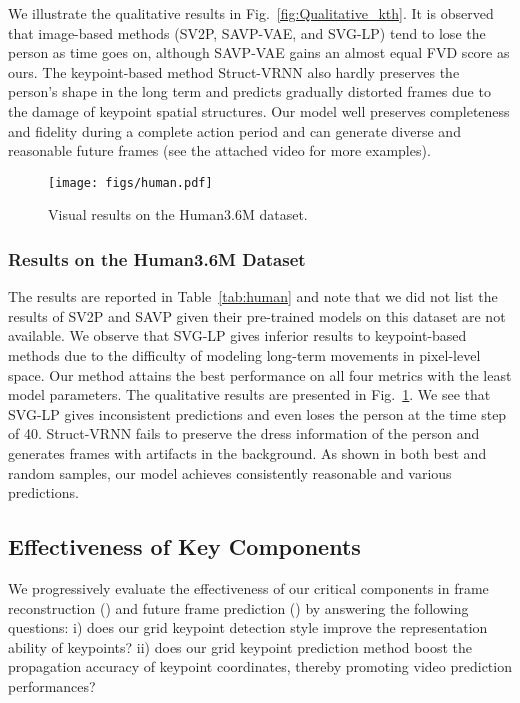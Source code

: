 \documentclass[letterpaper, 10 pt, conference]{ieeeconf}
\begin{document}
We illustrate the qualitative results in Fig.~\ref{fig:Qualitative_kth}.
It is observed that image-based methods (SV2P, SAVP-VAE, and SVG-LP) tend to lose the person as time goes on, although SAVP-VAE gains an almost equal FVD score as ours.
The keypoint-based method Struct-VRNN also hardly preserves the person's shape in the long term and predicts gradually distorted frames due to the damage of keypoint spatial structures. 
Our model well preserves completeness and fidelity during a complete action period and can generate diverse and reasonable future frames (see the attached video for more examples).


\begin{figure}[t]
	\texttt{[image: figs/human.pdf]}
	\centering
	\caption{Visual results on the Human3.6M dataset.  
	}
	\label{fig:human}
	\vspace{-4mm}
\end{figure}



\subsubsection{Results on the Human3.6M Dataset}
The results are reported in Table~\ref{tab:human} and note that we did not list the results of SV2P and SAVP given their pre-trained models on this dataset are not available.
We observe that SVG-LP gives inferior results to keypoint-based methods due to the difficulty of modeling long-term movements in pixel-level space.
Our method attains the best performance on all four metrics with the least model parameters.
The qualitative results are presented in Fig.~\ref{fig:human}.
We see that SVG-LP gives inconsistent predictions and even loses the person at the time step of 40.
Struct-VRNN fails to preserve the dress information of the person and generates frames with artifacts in the background.
As shown in both best and random samples, our model achieves consistently reasonable and various predictions.



\subsection{Effectiveness of Key Components}
\label{sec:ablation}
We progressively evaluate the effectiveness of our critical components in frame reconstruction () and future frame prediction () by answering the following questions: 
i) does our grid keypoint detection style improve the representation ability of keypoints? 
ii) does our grid keypoint prediction method boost the propagation accuracy of keypoint coordinates, thereby promoting video prediction performances?
\end{document}
